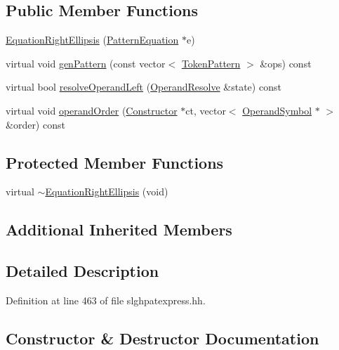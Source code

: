 \subsection*{Public Member Functions}
\begin{DoxyCompactItemize}
\item 
\mbox{\hyperlink{class_equation_right_ellipsis_ae3bad99eaef0687a10dd2b825d5b4dd3}{Equation\+Right\+Ellipsis}} (\mbox{\hyperlink{class_pattern_equation}{Pattern\+Equation}} $\ast$e)
\item 
virtual void \mbox{\hyperlink{class_equation_right_ellipsis_ae250ac9079b2f1d60f5b295095abe36f}{gen\+Pattern}} (const vector$<$ \mbox{\hyperlink{class_token_pattern}{Token\+Pattern}} $>$ \&ops) const
\item 
virtual bool \mbox{\hyperlink{class_equation_right_ellipsis_aa6d5d32c1f6da5d4ecffe983221d1497}{resolve\+Operand\+Left}} (\mbox{\hyperlink{struct_operand_resolve}{Operand\+Resolve}} \&state) const
\item 
virtual void \mbox{\hyperlink{class_equation_right_ellipsis_a43707cb523898b0a1b7d7cc1c7dbb779}{operand\+Order}} (\mbox{\hyperlink{class_constructor}{Constructor}} $\ast$ct, vector$<$ \mbox{\hyperlink{class_operand_symbol}{Operand\+Symbol}} $\ast$ $>$ \&order) const
\end{DoxyCompactItemize}
\subsection*{Protected Member Functions}
\begin{DoxyCompactItemize}
\item 
virtual \mbox{\hyperlink{class_equation_right_ellipsis_a6df3de6f32bbeea4efb49253ecf3ce03}{$\sim$\+Equation\+Right\+Ellipsis}} (void)
\end{DoxyCompactItemize}
\subsection*{Additional Inherited Members}


\subsection{Detailed Description}


Definition at line 463 of file slghpatexpress.\+hh.



\subsection{Constructor \& Destructor Documentation}
\mbox{\label{class_equation_right_ellipsis_a6df3de6f32bbeea4efb49253ecf3ce03}} 
